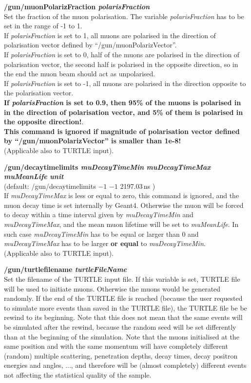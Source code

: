 \documentclass[twoside]{dis04}
\begin{document}
\begin{description}
\item{\bf /gun/muonPolarizFraction \emph{polarisFraction}}\\
	Set the fraction of the muon polarisation. The variable \emph{polarisFraction}
	has to be set in the range of -1 to 1.  \\
	If \emph{polarisFraction} is set to 1,  all muons are polarised in the direction 
	of polarisation vector defined by ``/gun/muonPolarizVector''.\\
	If \emph{polarisFraction} is set to 0,  half of the muons are polarised in the direction 
	of polarisation vector, the second half is polarised in the opposite direction, so
	in the end the muon beam should act as unpolarised.\\
	If \emph{polarisFraction} is set to -1,  all muons are polarised in the direction 
	opposite to the polarisation vector.\\
	{\bf If \emph{polarisFraction} is set to 0.9, then 95\% of the muons is polarised
	in in the direction of polarisation vector, and 5\% of them is polarised in the 
	opposite direction!}.\\
	{\bf This command is ignored if magnitude of polarisation vector defined by
	``/gun/muonPolarizVector'' is smaller than 1e-8!} \\
	(Applicable also to TURTLE input).

\item{\bf /gun/decaytimelimits \emph{muDecayTimeMin} \emph{muDecayTimeMax} \emph{muMeanLife} \emph{unit}}\\
	(default: /gun/decaytimelimits $-1$ $-1$ 2197.03\,ns ) \\
	If {\it muDecayTimeMax} is less or equal to zero, this command is ignored,
	and the muon decay time is set internally by {\sc Geant4}.
	Otherwise the muon will be forced to decay within a time interval given by
	{\it muDecayTimeMin} and {\it muDecayTimeMax}, and the mean muon lifetime will
	be set to {\it muMeanLife}.  In such case {\it muDecayTimeMin}
	has to be equal or larger than 0 and {\it muDecayTimeMax} has to be
	larger {\bf or equal} to {\it muDecayTimeMin}.\\
	(Applicable also to TURTLE input).

\item{\bf /gun/turtlefilename \emph{turtleFileName}}\\
	Set the filename of the TURTLE input file.  If this variable is set, TURTLE file 
        will be used to initiate muons.  Otherwise the muons would be generated randomly.
	If the end of the TURTLE file is reached (because the user requested to simulate
	more events than saved in the TURTLE file), the TURTLE file be be rewind to its
	beginning.  Note that this does not mean that the same events will be simulated
	after the rewind, because the random seed will be set differently than at the
	beginning of the simulation.  Note that the muons initialised
	at the same position and with the same momentum will have completely different
	(random) multiple scattering, penetration depths, decay times,
	decay positron energies and angles, ..., and therefore will be (almost completely) 
	different events not affecting the statistical quality of the sample.


\end{description}
\end{document}
